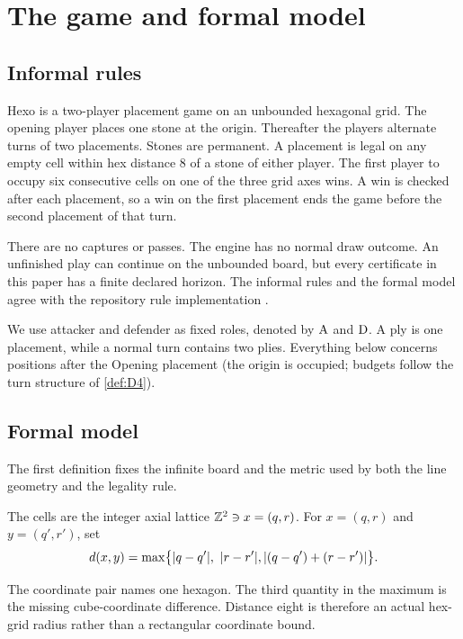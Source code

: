 \section{The game and formal model}
\label{sec:game}

\subsection{Informal rules}

Hexo is a two-player placement game on an unbounded hexagonal grid.  The
opening player places one stone at the origin.  Thereafter the players
alternate turns of two placements.  Stones are permanent.  A placement is
legal on any empty cell within hex distance 8 of a stone of either player.
The first player to occupy six consecutive cells on one of the three grid
axes wins.  A win is checked after each placement, so a win on the first
placement ends the game before the second placement of that turn.

There are no captures or passes.  The engine has no normal draw outcome.  An
unfinished play can continue on the unbounded board, but every certificate in
this paper has a finite declared horizon.  The informal rules and the formal
model agree with the repository rule implementation
\cite{hexobot-companions}.

We use attacker and defender as fixed roles, denoted by $\mathrm{A}$ and $\mathrm{D}$.  A
ply is one placement, while a normal turn contains two plies.  Everything
below concerns positions after the Opening placement (the origin is occupied;
budgets follow the turn structure of \cref{def:D4}).

\subsection{Formal model}

The first definition fixes the infinite board and the metric used by both
the line geometry and the legality rule.

\begin{definition}
\label{def:D1}
The cells are the integer axial lattice $\mathbb{Z}^{2}\ni x=(q,r)$.  For
$x=(q,r)$ and $y=(q',r')$, set
\[
  d(x,y)=\max\bigl\{|q-q'|,\ |r-r'|,
                  |(q-q')+(r-r')|\bigr\}.
\]
\end{definition}

\begin{plainterms}
The coordinate pair names one hexagon.  The third quantity in the maximum is
the missing cube-coordinate difference.  Distance eight is therefore an
actual hex-grid radius rather than a rectangular coordinate bound.
\end{plainterms}

